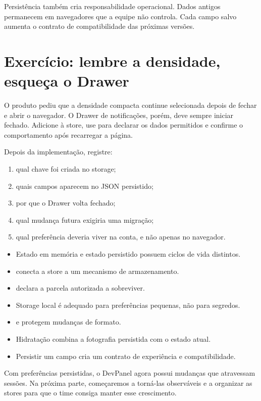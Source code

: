Persistência também cria responsabilidade operacional. Dados antigos permanecem
em navegadores que a equipe não controla. Cada campo salvo aumenta o contrato de
compatibilidade das próximas versões.

\section{Exercício: lembre a densidade, esqueça o Drawer}

\begin{tarefa}
O produto pediu que a densidade compacta continue selecionada depois de fechar e
abrir o navegador. O Drawer de notificações, porém, deve sempre iniciar fechado.
Adicione  à store, use  para declarar os dados
permitidos e confirme o comportamento após recarregar a página.
\end{tarefa}

Depois da implementação, registre:

\begin{enumerate}
  \item qual chave foi criada no storage;
  \item quais campos aparecem no JSON persistido;
  \item por que o Drawer volta fechado;
  \item qual mudança futura exigiria uma migração;
  \item qual preferência deveria viver na conta, e não apenas no navegador.
\end{enumerate}


\begin{resumo}
\begin{itemize}
  \item Estado em memória e estado persistido possuem ciclos de vida distintos.
  \item {} conecta a store a um mecanismo de armazenamento.
  \item {} declara a parcela autorizada a sobreviver.
  \item Storage local é adequado para preferências pequenas, não para segredos.
  \item {} e  protegem mudanças de formato.
  \item Hidratação combina a fotografia persistida com o estado atual.
  \item Persistir um campo cria um contrato de experiência e compatibilidade.
\end{itemize}
\end{resumo}

Com preferências persistidas, o DevPanel agora possui mudanças que atravessam
sessões. Na próxima parte, começaremos a torná-las observáveis e a organizar as
stores para que o time consiga manter esse crescimento.
